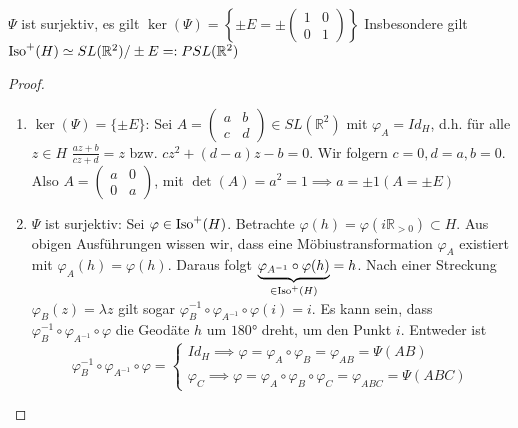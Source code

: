 \documentclass[../main.tex]{subfiles}
\begin{document}
\begin{theorem}
    $\Psi$ ist surjektiv, es gilt $\ker (\Psi) = \left \{ \pm  E = \pm  \begin{pmatrix}
        1 & 0 \\ 0 & 1
    \end{pmatrix} \right \}$
    Insbesondere gilt $\operatorname{Iso} ^+ (H) \simeq SL(\mathbb{R}^2) / \pm E =: PSL(\mathbb{R}^2)$
\end{theorem}

\begin{proof}
    \leavevmode
    \begin{enumerate}
        \item $\ker (\Psi) = \{ \pm E\}$: Sei $A = \begin{pmatrix}
            a & b \\ c & d
        \end{pmatrix} \in SL(\mathbb{R}^2)$ mit $\varphi _A = Id_H$,
        d.h. für alle $z \in H$
        $\frac{az+b}{cz+d}=z$ bzw. $cz^2 + (d-a)z -b=0$.
        Wir folgern $c=0, d=a, b = 0$. Also $A = \begin{pmatrix}
            a & 0 \\ 0 & a
        \end{pmatrix}$, mit $\det (A) = a^2 = 1 \implies a = \pm 1 (A = \pm E)$ 

        \item $\Psi $ ist surjektiv: Sei $\varphi \in \operatorname{Iso} ^+ (H)$. Betrachte
        $\varphi (h) = \varphi (i \mathbb{R}_{>0}) \subset H$. Aus obigen Ausführungen wissen wir,
        dass eine Möbiustransformation $\varphi _A$ existiert mit $\varphi _A (h)=\varphi(h)$.
        Daraus folgt $\underbrace{\varphi _{A^{-1}} \circ \varphi (h)}_{\in \operatorname{Iso} ^+(H)} = h$.
        Nach einer Streckung $\varphi _B(z)=\lambda z$ gilt sogar $\varphi _B^{-1} \circ \varphi _{A^{-1}} \circ \varphi (i) =i$.
        Es kann sein, dass $\varphi _B^{-1} \circ \varphi _{A^{-1}} \circ \varphi$ die Geodäte $h$ um
        $180$° dreht, um den Punkt $i$.
        Entweder ist
        $$\varphi _B^{-1} \circ \varphi _{A^{-1}} \circ \varphi = \begin{cases}
            Id _H \implies \varphi = \varphi _A \circ \varphi _B = \varphi _{AB} = \Psi (AB) \\
            \varphi _{C} \implies \varphi = \varphi _A \circ \varphi _B \circ \varphi _C = \varphi _{ABC}=\Psi (ABC)
        \end{cases}$$
    \end{enumerate}
\end{proof}
\end{document}
